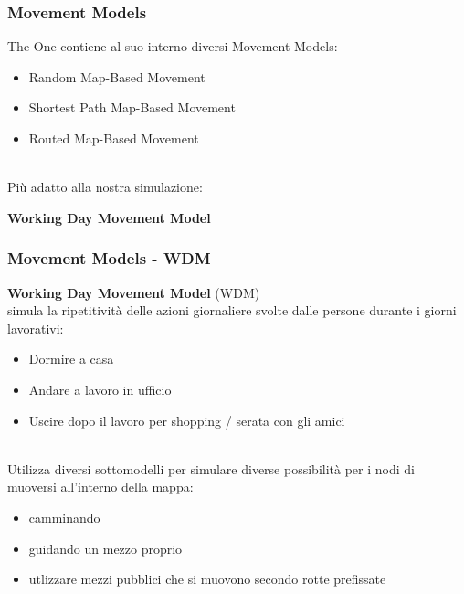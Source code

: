 \documentclass{beamer}
\begin{document}
\begin{frame}
\frametitle{Movement Models}
The One contiene al suo interno diversi Movement Models:
\begin{itemize}
\item Random Map-Based Movement
\item Shortest Path Map-Based Movement
\item Routed Map-Based Movement
\end{itemize}
\ \\
\pause
Più adatto alla nostra simulazione:
\begin{center}
\textbf{Working Day Movement Model}
\end{center}
\end{frame}

\begin{frame}
\frametitle{Movement Models - WDM}
\textbf{Working Day Movement Model} (WDM)\\
simula la ripetitività delle azioni giornaliere svolte dalle persone durante i giorni lavorativi:
\begin{itemize}
\item Dormire a casa
\item Andare a lavoro in ufficio
\item Uscire dopo il lavoro per shopping / serata con gli amici
\end{itemize}
\ \\
\pause
Utilizza diversi sottomodelli per simulare diverse possibilità per i nodi di muoversi all'interno della mappa:
\begin{itemize}
\item camminando
\item guidando un mezzo proprio
\item utlizzare mezzi pubblici che si muovono secondo rotte prefissate
\end{itemize}
\end{frame}
\end{document}

